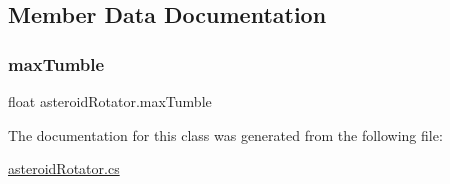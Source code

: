 \subsection{Member Data Documentation}
\mbox{\label{classasteroid_rotator_aa56366ba6b72b12f75b7dfaefc7fe7d6}} 
\subsubsection{\texorpdfstring{max\+Tumble}{maxTumble}}
{\footnotesize\ttfamily float asteroid\+Rotator.\+max\+Tumble}



The documentation for this class was generated from the following file\+:\begin{DoxyCompactItemize}
\item 
\mbox{\hyperlink{asteroid_rotator_8cs}{asteroid\+Rotator.\+cs}}\end{DoxyCompactItemize}
